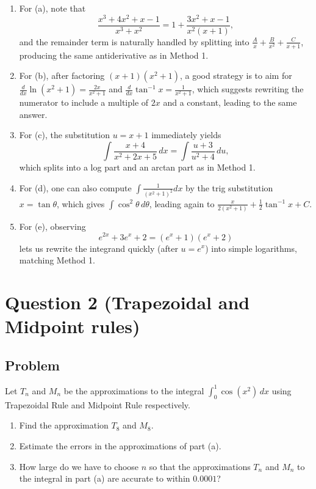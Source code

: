\documentclass[12pt]{article}
\begin{document}
\begin{enumerate}[label=(\alph*)]
\item For (a), note that
\[
\frac{x^{3}+4x^{2}+x-1}{x^{3}+x^{2}}
=1+\frac{3x^{2}+x-1}{x^{2}(x+1)},
\]
and the remainder term is naturally handled by splitting into \(\frac{A}{x}+\frac{B}{x^{2}}+\frac{C}{x+1}\), producing the same antiderivative as in Method 1.

\item For (b), after factoring \((x+1)(x^{2}+1)\), a good strategy is to aim for \(\frac{d}{dx}\ln(x^{2}+1)=\frac{2x}{x^{2}+1}\) and \(\frac{d}{dx}\tan^{-1}x=\frac{1}{x^{2}+1}\), which suggests rewriting the numerator to include a multiple of \(2x\) and a constant, leading to the same answer.

\item For (c), the substitution \(u=x+1\) immediately yields
\[
\int \frac{x+4}{x^{2}+2x+5}\,dx
=\int \frac{u+3}{u^{2}+4}\,du,
\]
which splits into a log part and an arctan part as in Method 1.

\item For (d), one can also compute \(\int \frac{1}{(x^{2}+1)^{2}}dx\) by the trig substitution \(x=\tan\theta\), which gives \(\int \cos^{2}\theta\,d\theta\), leading again to \(\frac{x}{2(x^{2}+1)}+\frac{1}{2}\tan^{-1}x+C\).

\item For (e), observing
\[
e^{2x}+3e^{x}+2=(e^{x}+1)(e^{x}+2)
\]
lets us rewrite the integrand quickly (after \(u=e^{x}\)) into simple logarithms, matching Method 1.
\end{enumerate}

\newpage


\section*{Question 2 (Trapezoidal and Midpoint rules)}

\subsection*{Problem}
Let \(T_n\) and \(M_n\) be the approximations to the integral \(\displaystyle \int_{0}^{1}\cos(x^{2})\,dx\) using Trapezoidal Rule and Midpoint Rule respectively.
\begin{enumerate}[label=(\alph*)]
\item Find the approximation \(T_{8}\) and \(M_{8}\).
\item Estimate the errors in the approximations of part (a).
\item How large do we have to choose \(n\) so that the approximations \(T_n\) and \(M_n\) to the integral in part (a) are accurate to within \(0.0001\)?
\end{enumerate}
\end{document}
